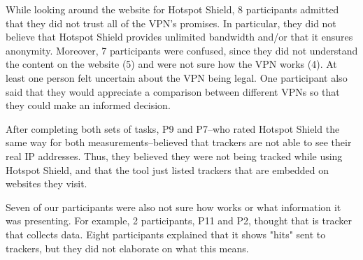 While looking around the website for Hotspot Shield, 8 participants admitted that they did not trust all of the VPN's promises. In particular, they did not believe
that Hotspot Shield provides unlimited bandwidth and/or that it ensures anonymity.
Moreover, 7 participants were confused, since they did not understand the content
on the website (5) and were not sure how the VPN works (4). At least one person
felt uncertain about the VPN being legal. One participant also said that
they would appreciate a comparison between different VPNs so that they could make an
informed decision.

After completing both sets of tasks, P9 and P7--who rated Hotspot Shield the same way for both measurements--believed that trackers are not able to see their real IP
addresses. Thus, they believed they were not being tracked while using Hotspot Shield, and that the tool just listed trackers that are embedded on websites they visit. 

Seven of our participants were also not sure how \tool works or what
information it was presenting. For example, 2 participants, P11 and P2,
thought that \tool is tracker that collects data. Eight participants
explained that it shows "hits" sent to trackers, but they did not elaborate on what this means. 
